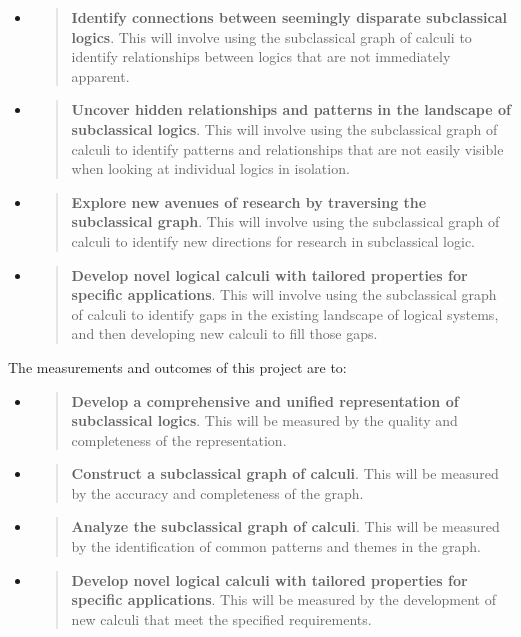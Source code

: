 \begin{itemize}
\item
  \begin{quote}
  \textbf{Identify connections between seemingly disparate subclassical
  logics}. This will involve using the subclassical graph of calculi to
  identify relationships between logics that are not immediately
  apparent.
  \end{quote}
\item
  \begin{quote}
  \textbf{Uncover hidden relationships and patterns in the landscape of
  subclassical logics}. This will involve using the subclassical graph
  of calculi to identify patterns and relationships that are not easily
  visible when looking at individual logics in isolation.
  \end{quote}
\item
  \begin{quote}
  \textbf{Explore new avenues of research by traversing the subclassical
  graph}. This will involve using the subclassical graph of calculi to
  identify new directions for research in subclassical logic.
  \end{quote}
\item
  \begin{quote}
  \textbf{Develop novel logical calculi with tailored properties for
  specific applications}. This will involve using the subclassical graph
  of calculi to identify gaps in the existing landscape of logical
  systems, and then developing new calculi to fill those gaps.
  \end{quote}
\end{itemize}

The measurements and outcomes of this project are to:

\begin{itemize}
\item
  \begin{quote}
  \textbf{Develop a comprehensive and unified representation of
  subclassical logics}. This will be measured by the quality and
  completeness of the representation.
  \end{quote}
\item
  \begin{quote}
  \textbf{Construct a subclassical graph of calculi}. This will be
  measured by the accuracy and completeness of the graph.
  \end{quote}
\item
  \begin{quote}
  \textbf{Analyze the subclassical graph of calculi}. This will be
  measured by the identification of common patterns and themes in the
  graph.
  \end{quote}
\item
  \begin{quote}
  \textbf{Develop novel logical calculi with tailored properties for
  specific applications}. This will be measured by the development of
  new calculi that meet the specified requirements.
  \end{quote}
\end{itemize}

